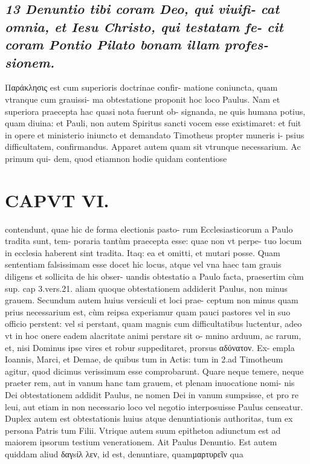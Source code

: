 \documentclass{article}
\begin{document}
\begin{pages}
\subsection*{\textit{13 Denuntio tibi coram Deo, qui viuifi- cat omnia, et Iesu Christo, qui testatam fe- cit coram Pontio Pilato bonam illam profes- sionem. }}\pstart Παράκλησις est cum superioris doctrinae confir- matione coniuncta, quam vtranque cum grauissi- ma obtestatione proponit hoc loco Paulus. Nam et superiora praecepta hac quasi nota fuerunt ob- signanda, ne quis humana potius, quam diuina: et Pauli, non autem Spiritus sancti vocem esse existimaret: et fuit in opere et ministerio iniuncto et demandato Timotheus propter muneris i- psius difficultatem, confirmandus. Apparet autem quam sit vtrunque necessarium. Ac primum qui- dem, quod etiamnon hodie quidam contentiose  \pend
\section*{CAPVT VI. }
\marginpar{[ p.467 ]}\pstart contendunt, quae hic de forma electionis pasto- rum Ecclesiasticorum a Paulo tradita sunt, tem- poraria tantùm praecepta esse: quae non vt perpe- tuo locum in ecclesia haberent sint tradita. Itaq: ea et omitti, et mutari posse. Quam sententiam falsissimam esse docet hic locus, atque vel vna haec tam grauis diligens et sollicita de his obser- uandis obtestatio a Paulo facta, praesertim cùm sup. cap 3.vers.21. aliam quoque obtestationem addiderit Paulus, non minus grauem.  \pend\pstart Secundum autem huius versiculi et loci prae- ceptum non minus quam prius necessarium est, cùm reipsa experiamur quam pauci pastores vel in suo officio perstent: vel si perstant, quam magnis cum difficultatibus luctentur, adeo vt in hoc onere eadem alacritate animi perstare sit o- mnino arduum, ac rarum, et, nisi Dominus ipse vires et robur suppeditaret, prorsus αδύνατον. Ex- empla Ioannis, Marci, et Demae, de quibus tum in Actis: tum in 2.ad Timotheum agitur, quod dicimus verissimum esse comprobarunt. Quare neque temere, neque praeter rem, aut in vanum hanc tam grauem, et plenam inuocatione nomi- nis Dei obtestationem addidit Paulus, ne nomen Dei in vanum sumpsisse, et pro re leui, aut etiam in non necessario loco vel negotio interposuisse Paulus censeatur.  \pend\pstart Duplex autem est obtestationis huius atque denuntiationis authoritas, tum ex persona Patris tum Filii. Vtrique  autem suum epitheton adiunctum est ad maiorem ipsorum testium venerationem. Ait Paulus Denuntio. Est autem quiddam aliud δαγsίλ λεν, id est, denuntiare, quamμαρτυρεῖν qua  \pend

\end{pages}
\end{document}
